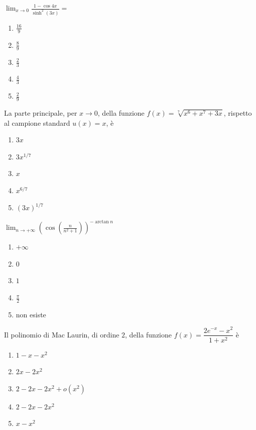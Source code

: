 \begin{quiz}
$\displaystyle\lim_{x\to0}\frac{1-\cos4x}{\sinh^2(3x)}=$
\begin{enumerate}
\item $\frac{16}9$
\item $\frac89$
\item $\frac23$
\item $\frac43$
\item $\frac29$
\end{enumerate}
\end{quiz}

\begin{quiz}
La parte principale, per $x\to0$, della funzione $f(x)=\sqrt[7]{x^6+x^7+3x}$, rispetto al campione standard $u(x)=x$, \`e
\begin{enumerate}
\item $3x$
\item $3x^{1/7}$
\item $x$
\item $x^{6/7}$
\item $(3x)^{1/7}$
\end{enumerate}
\end{quiz}

\begin{quiz}
$\displaystyle\lim_{n\to+\infty}\left(\cos\left(\frac{n}{n^2+1}\right)\right)^{-\arctan n}$
\begin{enumerate}
\item $+\infty$
\item $0$
\item $1$
\item $\frac\pi2$
\item non esiste
\end{enumerate}
\end{quiz}

\begin{quiz}
Il polinomio di Mac Laurin, di ordine $2$, della funzione $f(x)=\dfrac{2e^{-x}-x^2}{1+x^2}$ \`e
\begin{enumerate}
\item $1-x-x^2$
\item $2x-2x^2$
\item $2-2x-2x^2+o(x^2)$
\item $2-2x-2x^2$
\item $x-x^2$
\end{enumerate}
\end{quiz}

